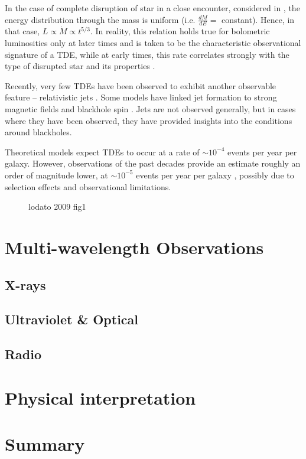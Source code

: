 \documentclass{tda}
\begin{document}
\noindent In the case of complete disruption of star in a close encounter, considered in \cite{evans_tidal_1989, lodato_stellar_2009}, the energy distribution through the mass is uniform (i.e. \(\frac{dM}{dE} = \) constant). Hence, in that case, \(L \propto \dot{M} \propto t^{5/3}\). In reality, this relation holds true for bolometric luminosities only at later times \cite{lodato_stellar_2009, lodato_multiband_2011} and is taken to be the characteristic observational signature of a TDE, while at early times, this rate correlates strongly with the type of disrupted star and its properties \cite{lodato_stellar_2009, lodato_recent_2015, guillochon_hydrodynamical_2013}. 

Recently, very few TDEs have been observed to exhibit another observable feature -- relativistic jets \cite{lodato_recent_2015}. Some models have linked jet formation to strong magnetic fields and blackhole spin \cite{dai_unified_2018}. Jets are not observed generally, but in cases where they have been observed, they have provided insights into the conditions around blackholes.

Theoretical models expect TDEs to occur at a rate of \(\sim 10^{-4}\) events per year per galaxy. However, observations of the past decades provide an estimate roughly an order of magnitude lower, at \(\sim 10^{-5}\) events per year per galaxy \cite{stone_rates_2016}, possibly due to selection effects and observational limitations.

\begin{figure}
	\caption{lodato 2009 fig1}
\end{figure}

\section{Multi-wavelength Observations}

\subsection{X-rays}

\subsection{Ultraviolet \& Optical}

\subsection{Radio}

\section{Physical interpretation}

\section{Summary}

\printbibliography
\end{document}

